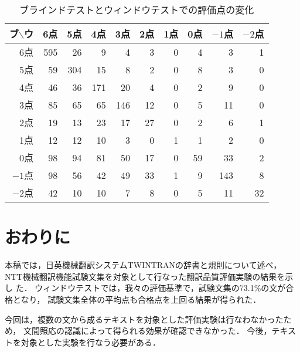\begin{table}[tbhp]
\caption{ブラインドテストとウィンドウテストでの評価点の変化}
\label{tab:experiment_result2}
\begin{center}
\begin{tabular}{|r||r|r|r|r|r|r|r|r|r|}\hline
\multicolumn{1}{|c||}{ブ$\backslash$ウ}&
\multicolumn{1}{c|}{6点}&\multicolumn{1}{c|}{5点}&\multicolumn{1}{c|}{4点}&
\multicolumn{1}{c|}{3点}&\multicolumn{1}{c|}{2点}&\multicolumn{1}{c|}{1点}&
\multicolumn{1}{c|}{0点}&\multicolumn{1}{c|}{$-1$点}&\multicolumn{1}{c|}{$-2$点}\\\hline\hline
6点&595      &26       &9       &4       &3       &0       &4       &3       &1       \\
5点&59       &304      &15      &8       &2       &0       &8       &3       &0       \\
4点&46       &36       &171     &20      &4       &0       &2       &9       &0       \\
3点&85       &65       &65      &146     &12      &0       &5       &11      &0       \\
2点&19       &13       &23      &17      &27      &0       &2       &6       &1       \\
1点&12       &12       &10      &3       &0       &1       &1       &2       &0       \\
0点&98       &94       &81      &50      &17      &0       &59      &33      &2       \\
$-1$点&98       &56       &42      &49      &33      &1       &9       &143     &8       \\
$-2$点&42       &10       &10      &7       &8       &0       &5       &11      &32      \\\hline
\end{tabular}
\end{center}
\end{table}

\section{おわりに}

本稿では，日英機械翻訳システムTWINTRANの辞書と規則について述べ，
NTT機械翻訳機能試験文集を対象として行なった翻訳品質評価実験の結果を示し
た．
ウィンドウテストでは，我々の評価基準で，試験文集の73.1\%の文が合格となり，
試験文集全体の平均点も合格点を上回る結果が得られた．

今回は，複数の文から成るテキストを対象とした評価実験は行なわなかったため，
文間照応の認識によって得られる効果が確認できなかった．
今後，テキストを対象とした実験を行なう必要がある．

